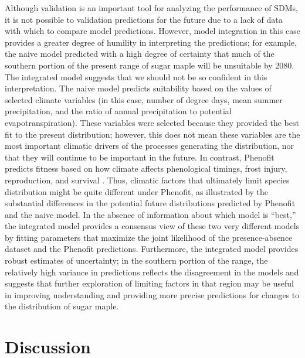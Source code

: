 \documentclass[11pt]{article}
\begin{document}
Although validation is an important tool for analyzing the performance of SDMs, it is not possible to validation predictions for the future due to a lack of data with which to compare model predictions.
However, model integration in this case provides a greater degree of humility in interpreting the predictions; for example, the naive model predicted with a high degree of certainty that much of the southern portion of the present range of sugar maple will be unsuitable by 2080.
The integrated model suggests that we should not be so confident in this interpretation.
The naive model predicts suitability based on the values of selected climate variables (in this case, number of degree days, mean summer precipitation, and the ratio of annual precipitation to potential evapotranspiration).
These variables were selected because they provided the best fit to the present distribution; however, this does not mean these variables are the most important climatic drivers of the processes generating the distribution, nor that they will continue to be important in the future.
In contrast, Phenofit predicts fitness based on how climate affects phenological timings, frost injury, reproduction, and survival \citep{Chuine2001, Morin2009}.
Thus, climatic factors that ultimately limit species distribution might be quite different under Phenofit, as illustrated by the substantial differences in the potential future distributions predicted by Phenofit and the naive model.
In the absence of information about which model is ``best,'' the integrated model provides a consensus view of these two very different models by fitting parameters that maximize the joint likelihood of the presence-absence dataset and the Phenofit predictions.
Furthermore, the integrated model provides robust estimates of uncertainty; in the southern portion of the range, the relatively high variance in predictions reflects the disagreement in the models and suggests that further exploration of limiting factors in that region may be useful in improving understanding and providing more precise predictions for changes to the distribution of sugar maple.


%
%



\section*{Discussion}
\end{document}
